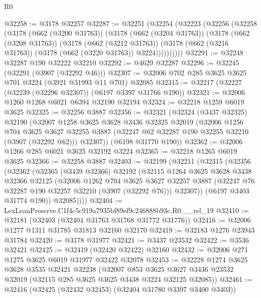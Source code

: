 \begin{lexlean}{R0}
\begin{coremodule}
@32258 := @3178 @32257
@32287 := @32251
    (@32254
      (@32223
        (@32256
          (@32258
            (@3178
              (@662 (@3200 @31763))
              (@3178
                (@662 (@3204 @31763))
                (@3178
                  (@662 (@3208 @31763))
                  (@3178
                    (@662 (@3212 @31763))
                    (@3178 (@662 (@3216 @31763)) (@3178 (@662 (@3220 @31763)) @3224))))))))))
@32291 := @32248 @32287 @190 @32222 @32210
@32292 := @4629 @32287
@32296 := @32245 (@32291 (@3907 (@32292 @46)))
@32307 := @32006 @702 @285 @3625 @3625 @701 @3224 (@3921 @31993 @11 @701) @32085
@32315 := @32217 (@32227 (@32239 (@32296 @32307)) (@6197 @3397 @31766 @190))
@32321 := @32006 @1260 @1268 @6021 @6394 @32190 @32194
@32324 := @32218 @1259 @6019 @3625
@32325 := @32256 @3887
@32356 := @32321
    (@32324
      (@3437 @32325)
      @32190
      (@32007
        @1258
        @3625
        @3628
        @3436
        @32325
        @32019
        (@32006
          @1256
          @704
          @3625
          @3627
          @32255
          @3887
          (@32247 @62 @32287 @190 @32255 @32210 (@3907 (@32292 @62)))
          @32307))
      (@6198 @31770 @190))
@32362 := @32006 @1266 @285 @6021 @3625 @32192 @3224
@32365 := @32218 @1265 @6019 @3625
@32366 := @32258 @3887
@32403 := @32199
    (@32211
      (@32315
        (@32356
          (@32362
            (@32365
              (@3439 @32366)
              @32192
              (@32115
                @1264
                @3625
                @3628
                @3438
                @32366
                @32125
                (@32006
                  @1262
                  @704
                  @3625
                  @3627
                  @32257
                  @3887
                  (@32247 @76 @32287 @190 @32257 @32210 (@3907 (@32292 @76)))
                  @32307))
              (@6197 @3403 @31774 @190))
            @32085))))
@32404 := LexLeanPreserve.C1f4c5c919a7935bf89ef9c246888b93c.R0.__rel_19
@32410 := @32181 (@32403 (@32404 @31763 @31768 @31772 @31776))
@32416 := @32006 @1277 @1311 @31785 @31813 @32160 @32170
@32419 := @32183 @1276 @23943 @31784
@32420 := @3178 @31977
@32421 := @3437 @23532
@32422 := @3536 @32421
@32425 := @32419 (@32420 @32422) @32160
@32432 := @32006 @271 @1275 @3625 @6019 @31977 @32422 @32078
@32453 := @32228
    @1274
    @3625
    @3628
    @3535
    @32421
    @32238
    (@32007
      @853
      @3625
      @3627
      @3436
      @23532
      @32019
      (@32115 @285 @3625 @3625 @3438 @3224 @32125 @32085))
@32461 := @32416 (@32425 (@32432 @32453) (@32404 @31780 @3397 @3400 @3403))

\end{coremodule}
\end{lexlean}
